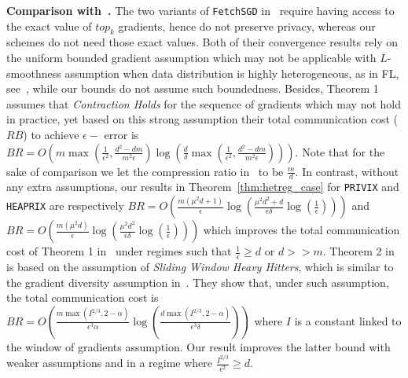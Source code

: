 \documentclass[twoside]{article}
\begin{document}
\vspace{0.05in}\noindent\textbf{Comparison with~\cite{rothchild2020fetchsgd}.}
The two variants of \texttt{FetchSGD} in~\cite{rothchild2020fetchsgd} require having access to the exact value of $top_k$ gradients, hence do not preserve privacy, whereas our schemes do not need those exact values.
Both of their convergence results rely on the uniform bounded gradient assumption which may not be applicable with $L$-smoothness assumption when data distribution is highly heterogeneous, as in FL, see~\cite{bayoumi2020tighter}, while our bounds do not assume such boundedness.
Besides, Theorem 1~\cite{rothchild2020fetchsgd} assumes that \emph{Contraction Holds} for the sequence of gradients which may not hold in practice, yet based on this strong assumption their total communication cost ($RB$) to achieve $\epsilon-$ error is  $BR=O\left(m\max(\frac{1}{\epsilon^2},\frac{d^2-dm}{m^2\epsilon})\log\left(\frac{d}{\delta}\max(\frac{1}{\epsilon^2},\frac{d^2-dm}{m^2\epsilon})\right)\right)$.
Note that for the sake of comparison we let the compression ratio in~\cite{rothchild2020fetchsgd} to be $\frac{m}{d}$. 
In contrast, without any extra assumptions, our results in Theorem~\ref{thm:hetreg_case} for \texttt{PRIVIX} and \texttt{HEAPRIX} are respectively $BR=O(\frac{m(\mu^2d+1)}{\epsilon}\log(\frac{\mu^2d^2+d}{\epsilon\delta}\log(\frac{1}{\epsilon})))$ and $BR=O(\frac{m(\mu^2d)}{\epsilon}\log(\frac{\mu^2d^2}{\epsilon\delta}\log(\frac{1}{\epsilon})))$ which improves the total communication cost of Theorem 1 in~\cite{rothchild2020fetchsgd} under regimes such that $\frac{1}{\epsilon}\geq d$ or $d>>m$. 
Theorem 2 in~\cite{rothchild2020fetchsgd} is based on the assumption of \emph{Sliding Window Heavy Hitters}, which is similar to the gradient diversity assumption in~\cite{li2018federated,haddadpour2019convergence}. 
They show that, under such assumption, the total communication cost is $BR=O\left(\frac{m\max(I^{2/3},2-\alpha)}{\epsilon^3\alpha}\log\left(\frac{d\max(I^{2/3},2-\alpha)}{\epsilon^3\delta}\right)\right)$ where $I$ is a constant linked to the window of gradients assumption.
Our result improves the latter bound with weaker assumptions and in a regime where $\frac{I^{2/3}}{\epsilon^2}\geq d$. 
\end{document}
